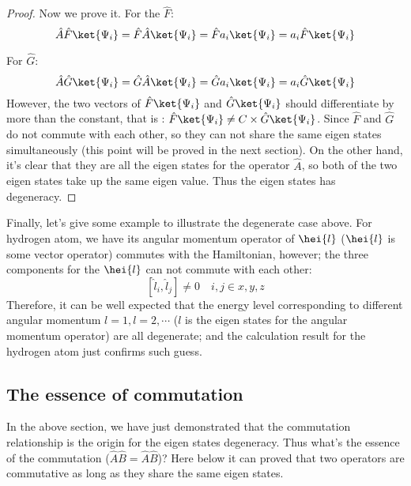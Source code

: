 \begin{proof}
Now we prove it. For the $\hat{F}$:
\begin{equation}\label{}
\hat{A}\hat{F}\ket{\Psi_{i}} = \hat{F}\hat{A}\ket{\Psi_{i}} =
\hat{F}a_{i}\ket{\Psi_{i}} = a_{i}\hat{F}\ket{\Psi_{i}}
\end{equation}

For $\hat{G}$:
\begin{equation}\label{}
\hat{A}\hat{G}\ket{\Psi_{i}} = \hat{G}\hat{A}\ket{\Psi_{i}} =
\hat{G}a_{i}\ket{\Psi_{i}} = a_{i}\hat{G}\ket{\Psi_{i}}
\end{equation}
However, the two vectors of $\hat{F}\ket{\Psi_{i}}$ and
$\hat{G}\ket{\Psi_{i}}$ should differentiate by more than the
constant, that is : $\hat{F}\ket{\Psi_{i}} \neq C\times
\hat{G}\ket{\Psi_{i}}$. Since $\hat{F}$ and $\hat{G}$ do not commute
with each other, so they can not share the same eigen states
simultaneously (this point will be proved in the next section). On
the other hand, it's clear that they are all the eigen states for
the operator $\hat{A}$, so both of the two eigen states take up the
same eigen value. Thus the eigen states has degeneracy. \qedhere
\end{proof}

Finally, let's give some example to illustrate the degenerate case
above. For hydrogen atom, we have its angular momentum operator of
$\hei{l}$ ($\hei{l}$ is some vector operator) commutes with the
Hamiltonian, however; the three components for the $\hei{l}$ can not
commute with each other:
\begin{equation}\label{}
[\hat{l}_{i}, \hat{l}_{j}] \neq 0 \quad i, j \in x, y, z
\end{equation}
Therefore, it can be well expected that the energy level
corresponding to different angular momentum $l=1, l=2, \cdots$ ($l$
is the eigen states for the angular momentum operator) are all
degenerate; and the calculation result for the hydrogen atom just
confirms such guess.



\subsection{The essence of commutation}
\label{essence_in_operator}
%
%
%
%
%
In the above section, we have just demonstrated that the commutation
relationship is the origin for the eigen states degeneracy. Thus
what's the essence of the commutation ($\hat{A}\hat{B}=
\hat{A}\hat{B}$)? Here below it can proved that two operators are
commutative as long as they share the same eigen states.

